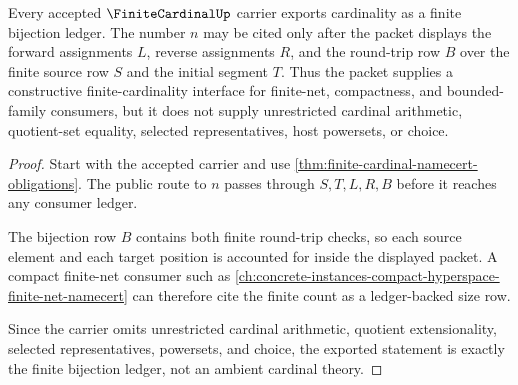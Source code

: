 \begin{theorem}
\label{thm:finite-cardinal-bijection-ledger}
Every accepted $\FiniteCardinalUp$ carrier exports cardinality as a finite bijection ledger. The number $n$ may be cited only after the packet displays the forward assignments $L$, reverse assignments $R$, and the round-trip row $B$ over the finite source row $S$ and the initial segment $T$. Thus the packet supplies a constructive finite-cardinality interface for finite-net, compactness, and bounded-family consumers, but it does not supply unrestricted cardinal arithmetic, quotient-set equality, selected representatives, host powersets, or choice.
\end{theorem}
\begin{proof}
Start with the accepted carrier and use \autoref{thm:finite-cardinal-namecert-obligations}. The public route to $n$ passes through $S,T,L,R,B$ before it reaches any consumer ledger.

The bijection row $B$ contains both finite round-trip checks, so each source element and each target position is accounted for inside the displayed packet. A compact finite-net consumer such as \autoref{ch:concrete-instances-compact-hyperspace-finite-net-namecert} can therefore cite the finite count as a ledger-backed size row.

Since the carrier omits unrestricted cardinal arithmetic, quotient extensionality, selected representatives, powersets, and choice, the exported statement is exactly the finite bijection ledger, not an ambient cardinal theory.
\end{proof}


\begin{closurestatus}{\FiniteCardinalUp}
  \theoryclosure{\seedClosure}
  \formalstatus{\unformalizedV}
\end{closurestatus}
